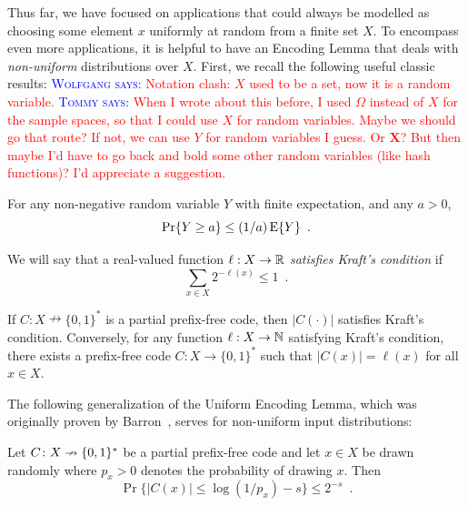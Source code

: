 \documentclass{patmorin}
\newcommand{\aremark}[3]{\textcolor{blue}{\textsc{#1 #2:}}
  \textcolor{red}{\textsf{#3}}}
\newcommand{\tommy}[2][says]{\aremark{Tommy}{#1}{#2}}
\newcommand{\wolfgang}[2][says]{\aremark{Wolfgang}{#1}{#2}}
\begin{document}
Thus far, we have focused on applications that could always be
modelled as choosing some element $x$ uniformly at random from a
finite set $X$. To encompass even more applications, it is helpful to
have an Encoding Lemma that deals with \emph{non-uniform}
distributions over $X$. First, we recall the following useful classic
results: \wolfgang{Notation clash: $X$ used to be a set, now it is a
  random variable.} \tommy{When I wrote about this before, I used
  $\Omega$ instead of $X$ for the sample spaces, so that I could use
  $X$ for random variables. Maybe we should go that route? If not, we
  can use $Y$ for random variables I guess. Or $\mathbf{X}$? But then
  maybe I'd have to go back and bold some other random variables (like
  hash functions)? I'd appreciate a suggestion.}
\begin{thm}
  For any non-negative random variable $Y$ with finite
  expectation, and any $a > 0$,
  \[
    \Pr\{Y \geq a\} \leq (1/a) \operatorname{\mathrm{E}}\{Y\} \enspace .
  \]
\end{thm}

We will say that a real-valued function $\ell : X \to \mathbb{R}$
\emph{satisfies Kraft's condition} if
\[
  \sum_{x \in X} 2^{-\ell(x)} \leq 1 \enspace .
\]
\begin{lem}
  If $C : X \nrightarrow \{0,1\}^*$ is a partial prefix-free code,
  then $|C(\cdot)|$ satisfies Kraft's condition. Conversely, for any
  function $\ell : X \to \mathbb{N}$ satisfying Kraft's condition, there
  exists a prefix-free code $C : X \to \{0, 1\}^*$ such that
  $|C(x)| = \ell(x)$ for all $x \in X$.
\end{lem}

The following generalization of the Uniform Encoding Lemma, which was
originally proven by Barron~\cite[Theorem~3.1]{barron:dissertation},
serves for non-uniform input distributions:
\begin{lem}  
  Let $C\colon X\nrightarrow\{0,1\}^*$ be a partial prefix-free code
  and let $x\in X$ be drawn randomly where $p_x > 0$ denotes the
  probability of drawing $x$.  Then
  \[
    \Pr\{ |C(x)| \le \log(1/p_x)-s\} \le 2^{-s} \enspace .
  \]
\end{lem}
\end{document}
